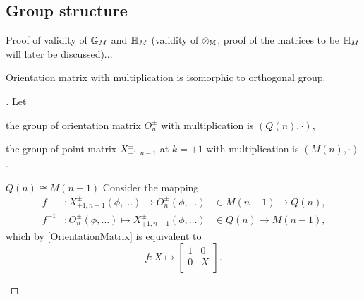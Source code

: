 \documentclass[stu, babel, american, biblatex, a4paper, draftall]{apa7}
\begin{document}
\subsection{Group structure}
Proof of validity of $\mathbb{G}_{M}$ and $\mathbb{H}_{M}$ (validity of $\otimes_{\mathbb{M}}$, proof of the matrices to be $\mathbb{H}_{M}$ will later be discussed)...
\begin{lemma}\label{OrientationGroup}
    Orientation matrix with multiplication
    is isomorphic to orthogonal group.
\end{lemma}
\begin{proof}[]
    Let
    \begin{APAitemize}
        \item the group of orientation matrix $O^{\pm}_{n}$ with multiplication is $\left(Q\left(n\right),\cdot\right)$,
        \item the group of point matrix $X^{\pm}_{+1,n-1}$ at $k=+1$ with multiplication is $\left(M\left(n\right),\cdot\right)$.
    \end{APAitemize}

    \begin{subproof}{$Q\left(n\right)\cong M\left(n-1\right)$}
        Consider the mapping
        \begin{align*}
            f      & : X^{\pm}_{+1,n-1}\left(\phi,\dots\right) \mapsto O^{\pm}_{n}\left(\phi,\dots\right) & \in M\left(n-1\right) \to Q\left(n\right) \text{,} \\
            f^{-1} & : O^{\pm}_{n}\left(\phi,\dots\right) \mapsto X^{\pm}_{+1,n-1}\left(\phi,\dots\right) & \in Q\left(n\right) \to M\left(n-1\right) \text{,}
        \end{align*}
        which by \cref{OrientationMatrix} is equivalent to
        \begin{equation} \label{PointToOrientationIsomorphism}
            f : X \mapsto \begin{bmatrix}
                1 & 0 \\
                0 & X \\
            \end{bmatrix}
            \text{.}
        \end{equation}


\end{subproof}
\end{proof}
\end{document}
